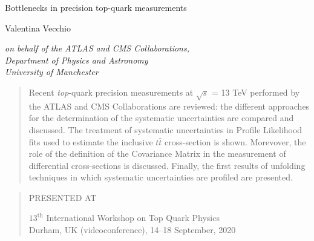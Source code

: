 \documentclass[12pt]{article}
\newcommand\pubnumber{SNSN-323-63}
\newcommand\pubdate{\today}
\def\institute{on behalf of the ATLAS and CMS Collaborations,\\Department of Physics and Astronomy\\ University of Manchester}
\def\Title#1{\begin{center} {\Large #1 } \end{center}}
\def\Author#1{\begin{center}{ \sc #1} \end{center}}
\def\Address#1{\begin{center}{ \it #1} \end{center}}
\newcommand\pubblock{\rightline{\begin{tabular}{l} \pubnumber\\
         \pubdate  \end{tabular}}}
\newenvironment{Abstract}{\begin{quotation}  }{\end{quotation}}
\newenvironment{Presented}{\begin{quotation} \begin{center} 
             PRESENTED AT\end{center}\bigskip 
      \begin{center}\begin{large}}{\end{large}\end{center} \end{quotation}}
\begin{document}
\begin{titlepage}
\pubblock

\vfill
\Title{Bottlenecks in precision top-quark measurements}
\vfill
\Author{ Valentina Vecchio}
\Address{\institute}
\vfill
\begin{Abstract}
Recent \emph{top}-quark precision measurements at $\sqrt{s}$ = 13 TeV performed by the ATLAS and CMS Collaborations are reviewed: the different approaches for the determination of the systematic uncertainties are compared and discussed. 
The treatment of systematic uncertainties in Profile Likelihood fits used to estimate the inclusive $t\bar{t}$ cross-section is shown. Morevover, the role of the definition of the Covariance Matrix in the measurement of differential cross-sections is discussed. Finally, the first results of unfolding techniques in which systematic uncertainties are profiled are presented.

\end{Abstract}
\vfill
\begin{Presented}
$13^\mathrm{th}$ International Workshop on Top Quark Physics\\
Durham, UK (videoconference), 14--18 September, 2020
\end{Presented}
\vfill
\end{titlepage}
\def\thefootnote{\fnsymbol{footnote}}
\setcounter{footnote}{0}
%
\end{document}
